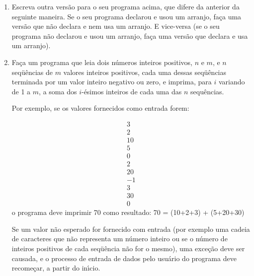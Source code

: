 \begin{enumerate}
Em cada situa\c{c}\~ao de entrada de dados, se um valor n\~ao esperado
for fornecido com entrada (por exemplo uma cadeia de caracteres que
n\~ao representa um n\'umero inteiro), uma exce\c{c}\~ao deve ser
causada, e o processo de entrada de dados pelo usu\'ario do programa
deve recome\c{c}ar, a partir do in\'{\i}cio (isto \'e, a partir da
leitura de $n$). 

Dica 2: o m\'etodo {\it parseInt\/} causa uma exce\c{c}\~ao ({\it
NumberFormatException\/}) se a cadeia de caracteres fornecida como
argumento n\~ao representar um n\'umero inteiro.

Dica 3: N\~ao esque\c{c}a de testar se o primeiro valor lido (de $n$)
\'e um valor positivo, e causar uma exce\c{c}\~ao em caso contr\'ario. 
Voc\^e pode causar e tratar apenas a exce\c{c}\~ao {\it Exception\/},
pois a exce\c{c}\~ao {\it NumberFormatException\/} \'e um objeto da
classe {\it Exception\/}, e portanto ser\'a tamb\'em tratada por um
tratador que trata (recebe como argumento) uma exce\c{c}\~ao {\it
NumberFormatException\/}.

\item Escreva outra vers\~ao para o seu programa acima, que difere da
anterior da seguinte maneira. Se o seu programa declarou e usou um
arranjo, fa\c{c}a uma vers\~ao que n\~ao declara e nem usa um
arranjo. E vice-versa (se o seu programa n\~ao declarou e usou um
arranjo, fa\c{c}a uma vers\~ao que declara e usa um arranjo).

\item Fa\c{c}a um programa que leia dois n\'umeros inteiros positivos,
$n$ e $m$, e $n$ seq\"u\^encias de $m$ valores inteiros positivos,
cada uma dessas seq\"u\^encias terminada por um valor inteiro negativo
ou zero, e imprima, para $i$ variando de 1 a $m$, a soma dos
$i$-\'esimos inteiros de cada uma das $n$ sequ\^encias. 

Por exemplo, se os valores fornecidos como entrada forem:
  
  \[ \begin{array}{l}
        3    \\
        2    \\
        10   \\
        5    \\
        0    \\
        2    \\
        20   \\
        -1   \\
        3    \\
        30   \\
        0
      \end{array} \]
o programa deve imprimir 70 como resultado: 
  70 = (10+2+3) + (5+20+30) 

Se um valor n\~ao esperado for fornecido com entrada (por exemplo uma
cadeia de caracteres que n\~ao representa um n\'umero inteiro ou se o
n\'umero de inteiros positivos de cada seq\"u\^encia n\~ao for o
mesmo), uma exce\c{c}\~ao deve ser causada, e o processo de entrada de
dados pelo usu\'ario do programa deve recome\c{c}ar, a partir do
in\'{\i}cio.

\end{enumerate}



